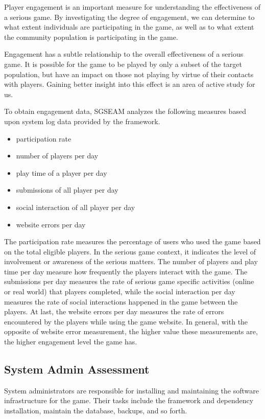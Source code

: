 Player engagement is an important measure for understanding the effectiveness of a serious game.
By investigating the degree of engagement, we can determine to what extent individuals are
participating in the game, as well as to what extent the community population is participating in
the game.

Engagement has a subtle relationship to the overall effectiveness of a serious game. It is
possible for the game to be played by only a subset of the target population, but
have an impact on those not playing by virtue of their contacts with players. Gaining
better insight into this effect is an area of active study for us. 

To obtain engagement data, SGSEAM analyzes the following measures
based upon system log data provided by the framework.

\begin{itemize}
\item participation rate
\item number of players per day
\item play time of a player per day
\item submissions of all player per day
\item social interaction of all player per day
\item website errors per day
\end{itemize}

The participation rate measures the percentage of users who used the game based on the total
eligible players. In the serious game context, it indicates the level of involvement or awareness
of the serious matters. The number of players and play time per day measure how frequently the
players interact with the game. The submissions per day measures the rate of serious game
specific activities (online or real world) that players completed, while the social interaction
per day measures the rate of social interactions happened in the game between the players. At
last, the website errors per day measures the rate of errors encountered by the players while
using the game website. In general, with the opposite of website error measurement, the higher
value these measurements are, the higher engagement level the game has.

\subsection{System Admin Assessment}

System administrators are responsible for installing and maintaining the software infrastructure
for the game. Their tasks include the framework and dependency installation, maintain the database, backups, and so forth.

